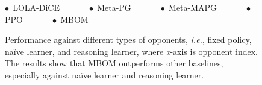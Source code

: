 \documentclass{article}
\begin{document}
\begin{figure}[t]
    \vspace{1.5mm}
    \begin{small}
    \textcolor[RGB]{129,114,179}{$\bullet\ \ $}LOLA-DiCE\ \ \ \ \ \ \
    \textcolor[RGB]{147,120,96}{$\bullet\ \ $}Meta-PG\ \ \ \ \ \ \ 
    \textcolor[RGB]{76,114,176}{$\bullet\ \ $}Meta-MAPG\ \ \ \ \ \ \
    \textcolor[RGB]{85,168,104}{$\bullet\ \ $}PPO\ \ \ \ \ \ \ 
    \textcolor[RGB]{196,78,82}{$\bullet\ \ $}MBOM\ \ 
    \end{small}
    \caption{Performance against different types of opponents, \textit{i.e.}, fixed policy, na\"ive learner, and reasoning learner, where \textit{x}-axis is opponent index. The results show that MBOM outperforms other baselines, especially against na\"ive learner and reasoning learner.}
    \label{fig:performance}
    \vspace*{-3mm}
\end{figure}
\end{document}
